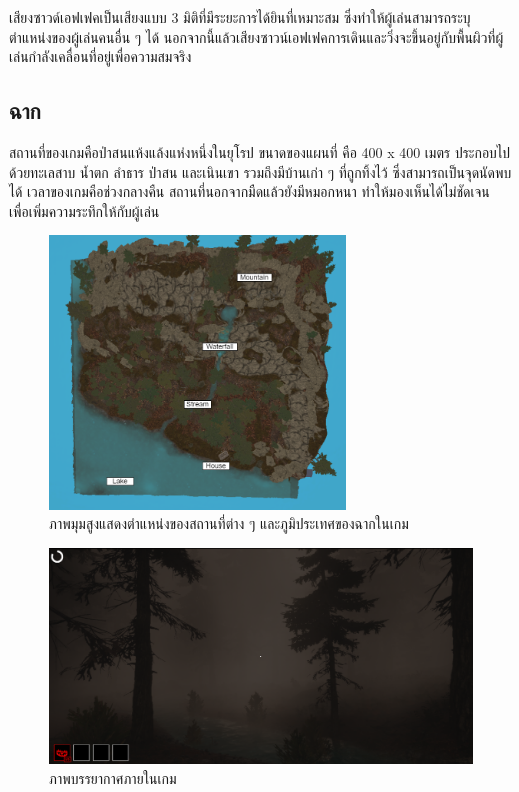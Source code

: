 เสียงซาวด์เอฟเฟคเป็นเสียงแบบ 3 มิติที่มีระยะการได้ยินที่เหมาะสม ซึ่งทำให้ผู้เล่นสามารถระบุตำแหน่งของผู้เล่นคนอื่น ๆ ได้ 
นอกจากนี้แล้วเสียงซาวน์เอฟเฟคการเดินและวิ่งจะขึ้นอยู่กับพื้นผิวที่ผู้เล่นกำลังเคลื่อนที่อยู่เพื่อความสมจริง

\subsection{ฉาก}

สถานที่ของเกมคือป่าสนแห้งแล้งแห่งหนึ่งในยุโรป ขนาดของแผนที่ คือ 400 x 400 เมตร ประกอบไปด้วยทะเลสาบ 
น้ำตก ลำธาร ป่าสน และเนินเขา รวมถึงมีบ้านเก่า ๆ ที่ถูกทิ้งไว้ ซึ่งสามารถเป็นจุดนัดพบได้ เวลาของเกมคือช่วงกลางคืน 
สถานที่นอกจากมืดแล้วยังมีหมอกหนา ทำให้มองเห็นได้ไม่ชัดเจน เพื่อเพิ่มความระทึกให้กับผู้เล่น

\begin{figure}[p]
  \begin{center}
  \includegraphics[width=0.7\textwidth]{./img/scene/WitchHunter-Map.png}
  \end{center}
  \caption[ภาพมุมสูงแสดงตำแหน่งของสถานที่ต่าง ๆ
  และภูมิประเทศของฉากในเกม]{ภาพมุมสูงแสดงตำแหน่งของสถานที่ต่าง ๆ
  และภูมิประเทศของฉากในเกม}
  \label{ภาพมุมสูงแสดงตำแหน่งของสถานที่ต่าง ๆ
  และภูมิประเทศของฉากในเกม}
\end{figure}

\begin{figure}[p]
  \begin{center}
  \includegraphics[width=\textwidth]{./img/scene/atmosphere.png}
  \end{center}
  \caption[ภาพบรรยากาศภายในเกม]{ภาพบรรยากาศภายในเกม}
  \label{ภาพบรรยากาศภายในเกม}
\end{figure}

